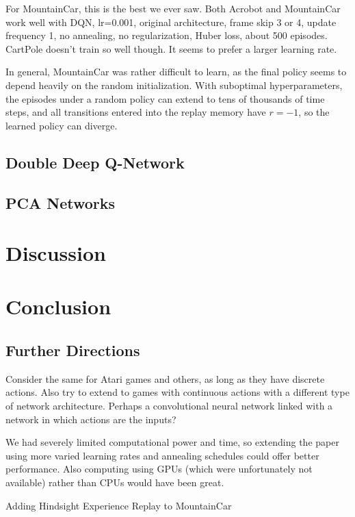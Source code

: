 \documentclass[11pt]{article}
\begin{document}
For MountainCar, this is the best we ever saw. Both Acrobot and MountainCar work well with DQN, lr=0.001, original architecture, frame skip 3 or 4, update frequency 1, no annealing, no regularization, Huber loss, about 500 episodes. CartPole doesn't train so well though. It seems to prefer a larger learning rate.

In general, MountainCar was rather difficult to learn, as the final policy seems to depend heavily on the random initialization. With suboptimal hyperparameters, the episodes under a random policy can extend to tens of thousands of time steps, and all transitions entered into the replay memory have $r = -1$, so the learned policy can diverge. 

\subsection{Double Deep Q-Network}

\subsection{PCA Networks}


\section{Discussion}
\section{Conclusion}

\subsection{Further Directions}

Consider the same for Atari games and others, as long as they have discrete actions. Also try to extend to games with continuous actions with a different type of network architecture. Perhaps a convolutional neural network linked with a network in which actions are the inputs?

We had severely limited computational power and time, so extending the paper using more varied learning rates and annealing schedules could offer better performance. Also computing using GPUs (which were unfortunately not available) rather than CPUs would have been great.

Adding Hindsight Experience Replay to MountainCar
\end{document}
